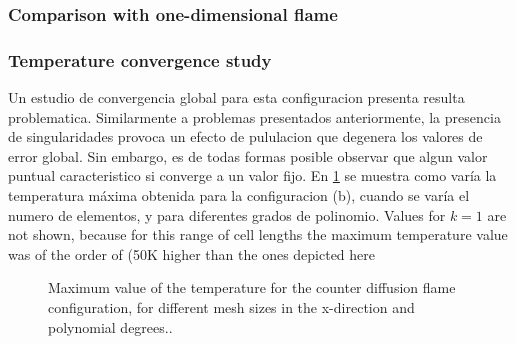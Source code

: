 



\subsubsection{Comparison with one-dimensional flame}

 
\subsubsection{Temperature convergence study}
Un estudio de convergencia global para esta configuracion presenta resulta problematica. Similarmente a problemas presentados anteriormente, la presencia de singularidades provoca un efecto de pululacion que degenera los valores de error global. Sin embargo, es de todas formas posible observar que algun valor puntual caracteristico si converge a un valor fijo. En \cref{fig:TemperatureConvergenceDiffFlame} se muestra como varía la temperatura máxima obtenida para la configuracion (b), cuando se varía el numero de elementos, y para diferentes grados de polinomio.  Values for $k=1$ are not shown, because for this range of cell lengths the maximum temperature value was of the order of (50K higher than the ones depicted here

\begin{figure}[tbp]
	\centering
	\caption{Maximum value of the temperature for the counter diffusion flame configuration, for different mesh sizes in the x-direction and polynomial degrees..}
	\label{fig:TemperatureConvergenceDiffFlame}
\end{figure}
\FloatBarrier
\newpage
